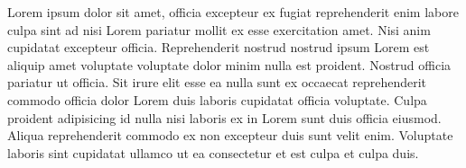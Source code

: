


Lorem ipsum dolor sit amet, officia excepteur ex fugiat reprehenderit enim labore culpa sint ad nisi Lorem pariatur mollit ex esse exercitation amet.
Nisi anim cupidatat excepteur officia.
Reprehenderit nostrud nostrud ipsum Lorem est aliquip amet voluptate voluptate dolor minim nulla est proident.
Nostrud officia pariatur ut officia.
Sit irure elit esse ea nulla sunt ex occaecat reprehenderit commodo officia dolor Lorem duis laboris cupidatat officia voluptate.
Culpa proident adipisicing id nulla nisi laboris ex in Lorem sunt duis officia eiusmod.
Aliqua reprehenderit commodo ex non excepteur duis sunt velit enim.
Voluptate laboris sint cupidatat ullamco ut ea consectetur et est culpa et culpa duis.

